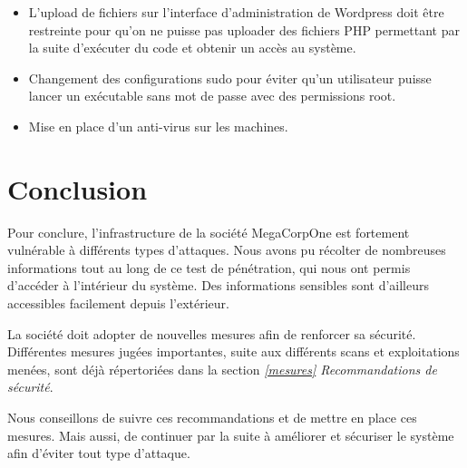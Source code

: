 \documentclass[french,paper=a4,oneside,captions=tableheading]{article}
\begin{document}
\begin{itemize}
\item L'upload de fichiers sur l'interface d'administration de Wordpress doit être restreinte pour qu'on ne puisse pas uploader des fichiers PHP permettant par la suite d'exécuter du code et obtenir un accès au système. \\

\item Changement des configurations sudo pour éviter qu'un utilisateur puisse lancer un exécutable sans mot de passe avec des permissions root. \\

\item Mise en place d'un anti-virus sur les machines. 

\end{itemize}










\cleardoublepage
\newpage


\section{Conclusion}

Pour conclure, l'infrastructure de la société MegaCorpOne est fortement vulnérable à différents types d'attaques. Nous avons pu récolter de nombreuses informations tout au long de ce test de pénétration, qui nous ont permis d'accéder à l'intérieur du système. Des informations sensibles sont d'ailleurs accessibles facilement depuis l'extérieur.

La société doit adopter de nouvelles mesures afin de renforcer sa sécurité. Différentes mesures jugées importantes, suite aux différents scans et exploitations menées, sont déjà répertoriées dans la section \textit{\ref{mesures} Recommandations de sécurité}.

Nous conseillons de suivre ces recommandations et de mettre en place ces mesures. Mais aussi, de continuer par la suite à améliorer et sécuriser le système afin d'éviter tout type d'attaque.
\end{document}
